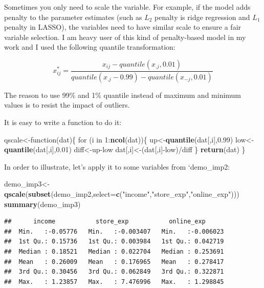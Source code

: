 \documentclass[]{book}
\newenvironment{Shaded}{\begin{snugshade}}{\end{snugshade}}
\newcommand{\KeywordTok}[1]{\textcolor[rgb]{0.13,0.29,0.53}{\textbf{{#1}}}}
\newcommand{\DataTypeTok}[1]{\textcolor[rgb]{0.13,0.29,0.53}{{#1}}}
\newcommand{\DecValTok}[1]{\textcolor[rgb]{0.00,0.00,0.81}{{#1}}}
\newcommand{\FloatTok}[1]{\textcolor[rgb]{0.00,0.00,0.81}{{#1}}}
\newcommand{\StringTok}[1]{\textcolor[rgb]{0.31,0.60,0.02}{{#1}}}
\newcommand{\NormalTok}[1]{{#1}}
\theoremstyle{definition}
\theoremstyle{definition}
\theoremstyle{remark}
\begin{document}
Sometimes you only need to scale the variable. For example, if the model
adds penalty to the parameter estimates (such as \(L_2\) penalty is
ridge regression and \(L_1\) penalty in LASSO), the variables need to
have similar scale to ensure a fair variable selection. I am heavy user
of this kind of penalty-based model in my work and I used the following
quantile transformation:

\[
x_{ij}^{*}=\frac{x_{ij}-quantile(x_{.j},0.01)}{quantile(x_{.j}-0.99)-quantile(x_{-j},0.01)}
\]

The reason to use 99\% and 1\% quantile instead of maximum and minimum
values is to resist the impact of outliers.

It is easy to write a function to do it:

\begin{Shaded}
\begin{Highlighting}[]
\NormalTok{qscale<-function(dat)\{}
  \NormalTok{for (i in }\DecValTok{1}\NormalTok{:}\KeywordTok{ncol}\NormalTok{(dat))\{}
    \NormalTok{up<-}\KeywordTok{quantile}\NormalTok{(dat[,i],}\FloatTok{0.99}\NormalTok{)}
    \NormalTok{low<-}\KeywordTok{quantile}\NormalTok{(dat[,i],}\FloatTok{0.01}\NormalTok{)}
    \NormalTok{diff<-up-low}
    \NormalTok{dat[,i]<-(dat[,i]-low)/diff}
  \NormalTok{\}}
  \KeywordTok{return}\NormalTok{(dat)}
\NormalTok{\}}
\end{Highlighting}
\end{Shaded}

In order to illustrate, let's apply it to some variables from
`demo\_imp2:

\begin{Shaded}
\begin{Highlighting}[]
\NormalTok{demo_imp3<-}\KeywordTok{qscale}\NormalTok{(}\KeywordTok{subset}\NormalTok{(demo_imp2,}\DataTypeTok{select=}\KeywordTok{c}\NormalTok{(}\StringTok{"income"}\NormalTok{,}\StringTok{"store_exp"}\NormalTok{,}\StringTok{"online_exp"}\NormalTok{)))}
\KeywordTok{summary}\NormalTok{(demo_imp3)}
\end{Highlighting}
\end{Shaded}

\begin{verbatim}
##      income           store_exp           online_exp       
##  Min.   :-0.05776   Min.   :-0.003407   Min.   :-0.006023  
##  1st Qu.: 0.15736   1st Qu.: 0.003984   1st Qu.: 0.042719  
##  Median : 0.18521   Median : 0.022704   Median : 0.253691  
##  Mean   : 0.26009   Mean   : 0.176965   Mean   : 0.278417  
##  3rd Qu.: 0.30456   3rd Qu.: 0.062849   3rd Qu.: 0.322871  
##  Max.   : 1.23857   Max.   : 7.476996   Max.   : 1.298845
\end{verbatim}
\end{document}

